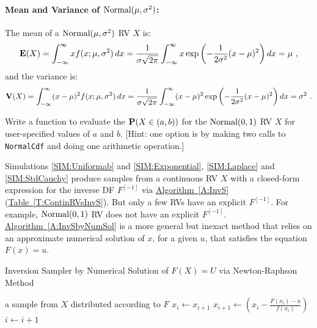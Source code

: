\paragraph{Mean and Variance of $\mbox{{\rm Normal}}(\mu,\sigma^2)$:}
The mean of a $\mbox{{\rm Normal}}(\mu,\sigma^2)$ RV $X$ is:
\[
\mathbf{E}(X) = \int_{-\infty}^{\infty} x f(x;\mu,\sigma^2)\,dx
=   \frac{1}{\sigma \sqrt{2 \pi}} \int_{-\infty}^{\infty} x
 \exp{\left( - \frac{1}{2 \sigma^2} (x-\mu)^2 \right)}\,dx
= \mu \ ,
\]
and the variance is:
\[
\mathbf{V}(X) = \int_{-\infty}^{\infty} (x-\mu)^2 f(x;\mu,\sigma^2)\,dx
=   \frac{1}{\sigma \sqrt{2 \pi}} \int_{-\infty}^{\infty} (x-\mu)^2
 \exp{\left( - \frac{1}{2 \sigma^2} (x-\mu)^2 \right)}\,dx
= \sigma^2 \ .
\]

\begin{labwork}\label{LW:NormalIntervalProb}
Write a function to evaluate the $\mathbf{P}(X \in (a,b))$ for the $\mbox{{\rm Normal}}(0,1)$ RV $X$ for user-specified values of $a$ and $b$. [Hint: one option is by making two calls to {\tt NormalCdf} and doing one arithmetic operation.]
\end{labwork}

Simulations \ref*{SIM:Uniformab} and \ref*{SIM:Exponential}, \ref*{SIM:Laplace} and \ref*{SIM:StdCauchy}
produce samples from a continuous RV $X$ with a closed-form expression for the inverse DF $F^{[-1]}$ via \hyperref[A:InvS]{Algorithm~\ref*{A:InvS}} (\hyperref[T:ContinRVsInvS]{Table~\ref*{T:ContinRVsInvS}}).  But only a few RVs have an explicit $F^{[-1]}$.  For example, $\mbox{{\rm Normal}}(0,1)$ RV does not have an explicit $F^{[-1]}$.
\hyperref[A:InvSbyNumSol]{Algorithm~\ref*{A:InvSbyNumSol}} is a more general but inexact method that relies on an approximate numerical solution of $x$, for a given $u$, that satisfies the equation $F(x)=u$.

\begin{algorithm}
\caption{ Inversion Sampler by Numerical Solution of $F(X)=U$ via Newton-Raphson Method}
\label{A:InvSbyNumSol}
\begin{algorithmic}[1]
 a sample from $X$ distributed according to $F$
\STATE $x_i \gets x_{i+1}$
\STATE $x_{i+1} \gets \left( x_{i} - \frac{F(x_i)-u}{f(x_i)} \right)$
\STATE $i \gets i+1$
\ENDWHILE
{}
\end{algorithmic}
\end{algorithm}

